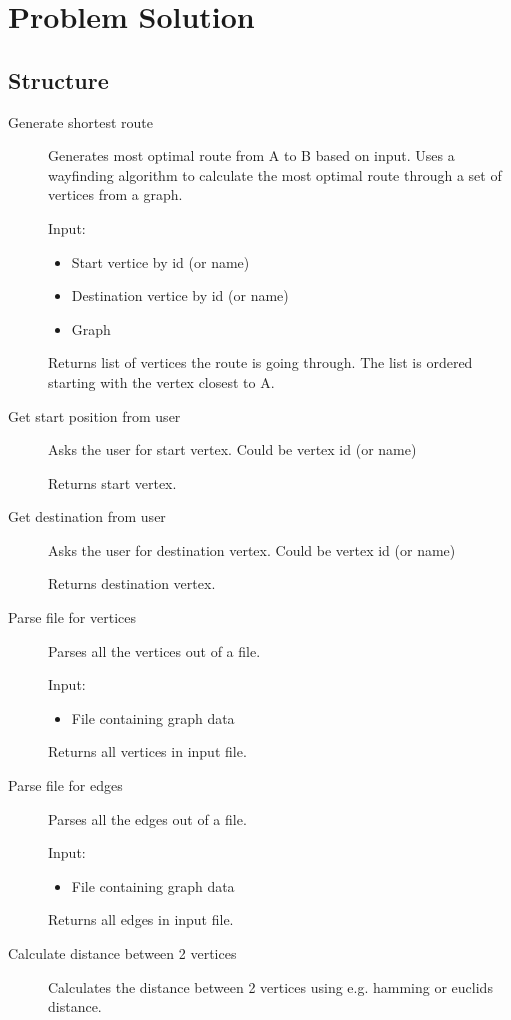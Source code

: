 \chapter{Problem Solution}
\label{cha:solution}


\section{Structure} %
\label{sec:structure}

\begin{description}
	\item[Generate shortest route] 
	Generates most optimal route from A to B based on input. Uses a wayfinding algorithm to calculate the most optimal route through a set of vertices from a graph.

	Input:
	\begin{itemize}
		\item Start vertice by id (or name)
		\item Destination vertice by id (or name)
		\item Graph
	\end{itemize}
	Returns list of vertices the route is going through. The list is ordered starting with the vertex closest to A.
	\item[Get start position from user] 
	Asks the user for start vertex. Could be vertex id (or name)

	Returns start vertex.
	\item[Get destination from user] 
	Asks the user for destination vertex. Could be vertex id (or name)

	Returns destination vertex.
	\item[Parse file for vertices] 
	Parses all the vertices out of a file.

	Input:
	\begin{itemize}
		\item File containing graph data
	\end{itemize}
	Returns all vertices in input file.
	\item[Parse file for edges] 
	Parses all the edges out of a file.

	Input:
	\begin{itemize}
		\item File containing graph data
	\end{itemize}
	Returns all edges in input file.
	\item[Calculate distance between 2 vertices] 
	Calculates the distance between 2 vertices using e.g. hamming or euclids distance.


\end{description}
